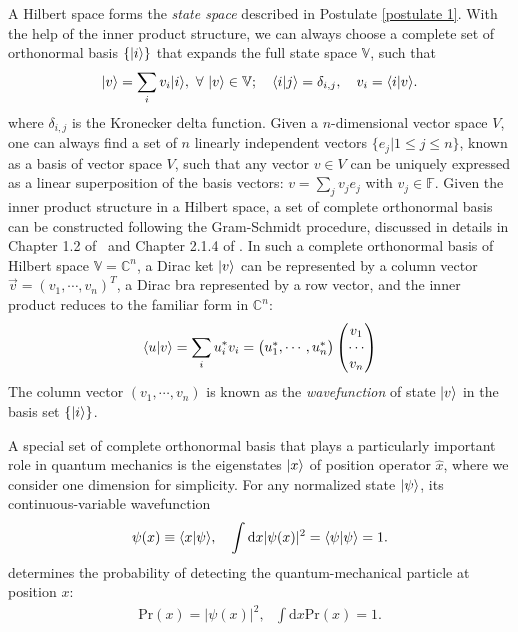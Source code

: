 A Hilbert space forms the \emph{state space} described in Postulate \ref{postulate 1}. With the help of the inner product structure, we can always choose a complete set of orthonormal basis $\{|{i}\rangle\}$ that expands the full state space $\mathbb{V}$, such that
\begin{align}
|{v}\rangle=\sum_iv_i|{i}\rangle,~\forall~|{v}\rangle\in\mathbb{V};~~~\langle{i|j}\rangle=\delta_{i,j},~~~v_i=\langle{i|v}\rangle.
\end{align}
where $\delta_{i,j}$ is the Kronecker delta function. Given a $n$-dimensional vector space $V$, one can always find a set of $n$ linearly independent vectors $\{e_j|1\leq j\leq n\}$, known as a basis of vector space $V$, such that any vector $v\in V$ can be uniquely expressed as a linear superposition of the basis vectors: $v=\sum_{j}v_je_j$ with $v_j\in\mathbb{F}$. Given the inner product structure in a Hilbert space, a set of complete orthonormal basis can be constructed following the Gram-Schmidt procedure, discussed in details in Chapter 1.2 of \shankar~and Chapter 2.1.4 of \nielsen. In such a complete orthonormal basis of Hilbert space $\mathbb{V}=\mathbb{C}^n$, a Dirac ket $|{v}\rangle$ can be represented by a column vector $\vec v=(v_1,\cdots,v_n)^T$, a Dirac bra represented by a row vector, and the inner product reduces to the familiar form in $\mathbb{C}^n$:
\begin{align}
\langle{u|v}\rangle=\sum_iu_i^\ast v_i=\begin{pmatrix} u_1^\ast,\cdots,u_n^\ast\end{pmatrix}\begin{pmatrix} v_1\\ \cdots\\v_n\end{pmatrix}
\end{align}
The column vector $(v_1,\cdots,v_n)$ is known as the \emph{wavefunction} of state $|{v}\rangle$ in the basis set $\{|{i}\rangle\}$. 

A special set of complete orthonormal basis that plays a particularly important role in quantum mechanics is the eigenstates $|{x}\rangle$ of position operator $\hat x$, where we consider one dimension for simplicity. For any normalized state $|{\psi}\rangle$, its continuous-variable wavefunction
\begin{align}
\psi(x)\equiv\langle{x|\psi}\rangle,~~~\int\text{d}x|\psi(x)|^2=\langle{\psi|\psi}\rangle=1.
\end{align}
determines the probability of detecting the quantum-mechanical particle at position $x$:
\begin{align}
    \text{Pr}(x)=|\psi(x)|^2,~~~\int\text{d}x\text{Pr}(x)=1.
\end{align}